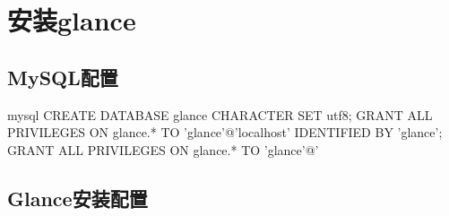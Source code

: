 \chapter{安装glance}
\label{glance_install}

\section{MySQL配置}

\begin{code-block}{mysql}
CREATE DATABASE glance CHARACTER SET utf8;
GRANT ALL PRIVILEGES ON glance.* TO 'glance'@'localhost' IDENTIFIED BY 'glance';
GRANT ALL PRIVILEGES ON glance.* TO 'glance'@'%
\end{code-block}

\section{Glance安装配置}
